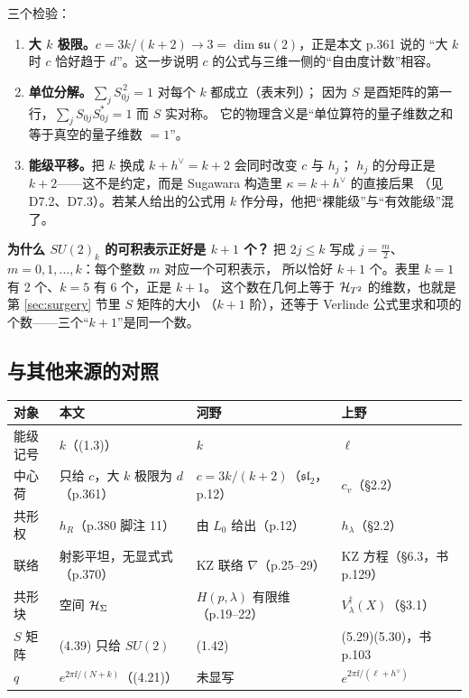 三个检验：
\begin{enumerate}[leftmargin=2em]
\item \textbf{大 $k$ 极限。}$c=3k/(k+2)\to3=\dim\mathfrak{su}(2)$，正是本文 p.361 说的
“大 $k$ 时 $c$ 恰好趋于 $d$”。这一步说明 $c$ 的公式与三维一侧的“自由度计数”相容。
\item \textbf{单位分解。}$\sum_jS_{0j}^{\,2}=1$ 对每个 $k$ 都成立（表末列）；
因为 $S$ 是酉矩阵的第一行，$\sum_jS_{0j}S_{0j}^*=1$ 而 $S$ 实对称。
它的物理含义是“单位算符的量子维数之和等于真空的量子维数 $=1$”。
\item \textbf{能级平移。}把 $k$ 换成 $k+h^\vee=k+2$ 会同时改变 $c$ 与 $h_j$；
$h_j$ 的分母正是 $k+2$——这不是约定，而是 Sugawara 构造里 $\kappa=k+h^\vee$ 的直接后果
（见 D7.2、D7.3）。若某人给出的公式用 $k$ 作分母，他把“裸能级”与“有效能级”混了。
\end{enumerate}

\begin{keypoint}
\textbf{为什么 $SU(2)_k$ 的可积表示正好是 $k+1$ 个？}
把 $2j\le k$ 写成 $j=\frac{m}{2}$、$m=0,1,\dots,k$：每个整数 $m$ 对应一个可积表示，
所以恰好 $k+1$ 个。表里 $k=1$ 有 2 个、$k=5$ 有 6 个，正是 $k+1$。
这个数在几何上等于 $\mathcal{H}_{T^2}$ 的维数，也就是第 \ref{sec:surgery} 节里 $S$ 矩阵的大小
（$k+1$ 阶），还等于 Verlinde 公式里求和项的个数——三个“$k+1$”是同一个数。
\end{keypoint}

\subsection{与其他来源的对照}

\begin{center}
\small
\begin{tabular}{@{}p{2.6cm}p{3.4cm}p{3.6cm}p{3.2cm}@{}}
\toprule
对象 & 本文 & 河野 & 上野 \\
\midrule
能级记号 & $k$（(1.3)） & $k$ & $\ell$ \\
中心荷 & 只给 $c$，大 $k$ 极限为 $d$（p.361） & $c=3k/(k+2)$（$\mathfrak{sl}_2$，p.12） & $c_v$（\S2.2）\\
共形权 & $h_R$（p.380 脚注 11） & 由 $L_0$ 给出（p.12） & $h_\lambda$（\S2.2）\\
联络 & 射影平坦，无显式式（p.370） & KZ 联络 $\nabla$（p.25--29） & KZ 方程（\S6.3，书 p.129）\\
共形块 & 空间 $\mathcal{H}_\Sigma$ & $H(p,\lambda)$ 有限维（p.19--22） & $V^\dagger_\lambda(X)$（\S3.1）\\
$S$ 矩阵 & (4.39) 只给 $SU(2)$ & (1.42) & (5.29)(5.30)，书 p.103 \\
$q$ & $e^{2\pi\ii/(N+k)}$（(4.21)） & 未显写 & $e^{2\pi\ii/(\ell+h^\vee)}$ \\
\bottomrule
\end{tabular}
\end{center}

